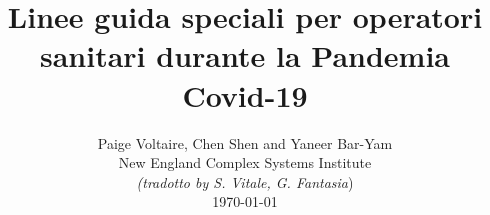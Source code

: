 \documentclass[onecolumn,journal]{IEEEtran}
\begin{document}
\title{\color{Brown} Linee guida speciali per operatori sanitari durante la Pandemia Covid-19\\
\vspace{-0.35ex}}
\author{Paige Voltaire, Chen Shen and Yaneer Bar-Yam \\ New England Complex Systems Institute \\
\vspace{+0.35ex}
\small{\textit{(tradotto by S. Vitale, G. Fantasia})}\\
 \today
  \vspace{-14ex} \\


\bigskip
\bigskip

\textbf{}
 }

\maketitle


\flushbottom %



\thispagestyle{empty} %




\end{document}
